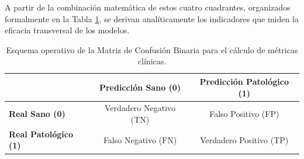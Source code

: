 \documentclass[12pt, oneside, english, spanish]{book}
\begin{document}
A partir de la combinación matemática de estos cuatro cuadrantes, organizados formalmente en la Tabla \ref{tab:esquema_matriz_confusion}, se derivan analíticamente los indicadores que miden la eficacia transversal de los modelos.

\begin{table}[htbp]
	\centering
	\caption{Esquema operativo de la Matriz de Confusión Binaria para el cálculo de métricas clínicas.}
	\label{tab:esquema_matriz_confusion}
	\begin{tabular}{l|cc}
		\hline
		& \textbf{Predicción Sano (0)} & \textbf{Predicción Patológico (1)} \\ \hline
		\textbf{Real Sano (0)} & Verdadero Negativo (TN) & Falso Positivo (FP) \\
		\textbf{Real Patológico (1)} & Falso Negativo (FN) & Verdadero Positivo (TP) \\ \hline
	\end{tabular}
\end{table}
\end{document}
